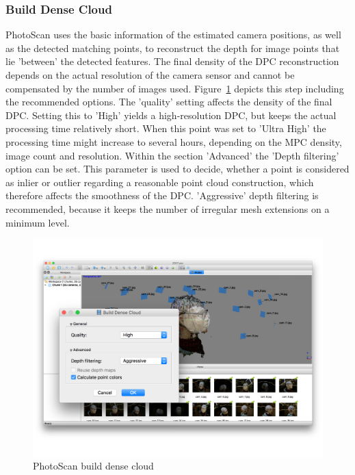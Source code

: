 \documentclass[12pt,a4paper]{scrartcl}
\begin{document}
\subsubsection{Build Dense Cloud}
PhotoScan uses the basic information of the estimated camera positions, as well as the detected matching points, to reconstruct the depth for image points that lie 'between' the detected features. The final density of the DPC reconstruction depends on the actual resolution of the camera sensor and cannot be compensated by the number of images used.
Figure~\ref{fig:photoscandense} depicts this step including the recommended options. The 'quality' setting affects the density of the final DPC. Setting this to 'High' yields a high-resolution DPC, but keeps the actual processing time relatively short. When this point was set to 'Ultra High' the processing time might increase to several hours, depending on the MPC density, image count and resolution. Within the section 'Advanced' the 'Depth filtering' option can be set. This parameter is used to decide, whether a point is considered as inlier or outlier regarding a reasonable point cloud construction, which therefore affects the smoothness of the DPC. 'Aggressive' depth filtering is recommended, because it keeps the number of irregular mesh extensions on a minimum level.
\begin{figure}[!h]
  \includegraphics[width=1\textwidth]{PhotoScan-dense}
  \caption{PhotoScan build dense cloud}
  \label{fig:photoscandense}
\end{figure}
\end{document}
